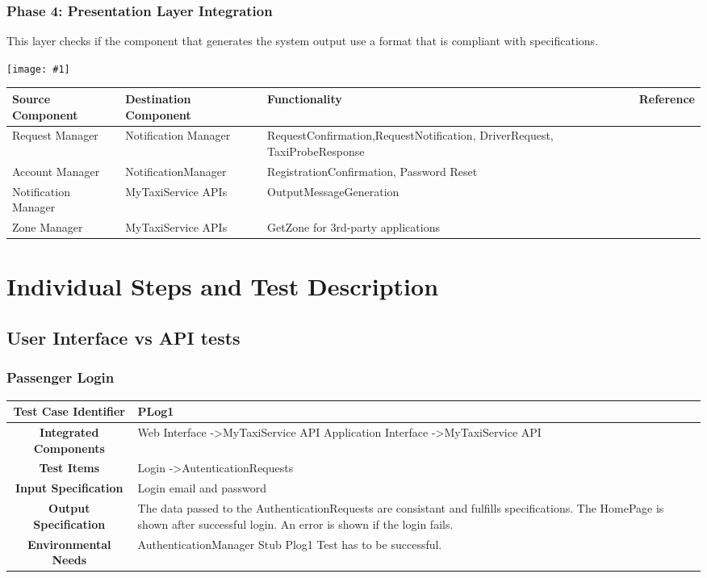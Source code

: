 \documentclass[11pt, a4paper,titlepage]{article}
\newcommand{\image}[1]{
	\begin{center}
		\noindent \texttt{[image: \#1]}
	\end{center}
}
\begin{document}
	\subsubsection{Phase 4: Presentation Layer Integration}
	This layer checks if the component that generates the system output use a format that is compliant with specifications.
	\newline
	\image{test_phase4.png}
	\begin{tabularx}{\textwidth}{| X |X |X |c|}
		\hline \textbf{Source Component} &\textbf{ Destination Component}&\textbf{Functionality} & \textbf{Reference} \\
		\hline Request Manager & Notification Manager & RequestConfirmation,\newline RequestNotification, DriverRequest,  TaxiProbeResponse & \\
		\hline Account Manager & NotificationManager & RegistrationConfirmation, Password Reset &\\
		\hline Notification Manager & MyTaxiService APIs & OutputMessageGeneration &\\
		\hline Zone Manager & MyTaxiService APIs & GetZone for 3rd-party applications &\\
		\hline
	\end{tabularx}	
	\newpage
	\section{Individual Steps and Test Description}
	\subsection{User Interface vs API tests}
	\subsubsection{Passenger Login}
	\begin{tabularx}{\textwidth}{| c|X|}
		\hline \textbf{Test Case Identifier} & PLog1 \\
		\hline \textbf{Integrated Components} & Web Interface -\textgreater MyTaxiService API \newline 
		Application Interface -\textgreater MyTaxiService API \\
		\hline \textbf{Test Items} & Login -\textgreater AutenticationRequests	 \\
		\hline \textbf{Input Specification} & Login email and password \\
		\hline \textbf{Output Specification} & 
		The data passed to the AuthenticationRequests are consistant and fulfills specifications.\newline
		The HomePage is shown after successful login.\newline
		An error is shown if the login fails. \\
		\hline \textbf{Environmental Needs} & AuthenticationManager Stub \newline Plog1 Test has to be successful.
		\\
		\hline
	\end{tabularx}
	\newline
	\newline
\end{document}
